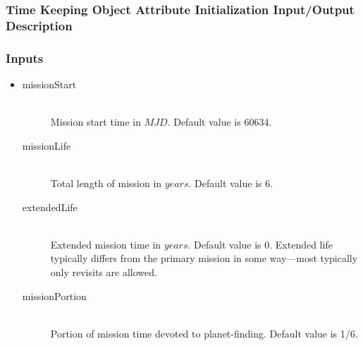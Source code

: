 \documentclass[cleanfoot]{asme2ej}
\begin{document}
\subsubsection{Time Keeping Object Attribute Initialization Input/Output Description}

\subsubsection*{Inputs}
\begin{itemize}
    \item
     \begin{description}
            \item[missionStart] \hfill \\
            Mission start time in $ MJD $. Default value is 60634.
            \item[missionLife] \hfill \\
            Total length of mission in $ years $. Default value is 6.
            \item[extendedLife] \hfill \\
            Extended mission time in $ years $. Default value is 0.  Extended life typically differs from the primary mission in some way---most typically only revisits are allowed.
            \item[missionPortion] \hfill \\
            Portion of mission time devoted to planet-finding. Default value is 1/6.
        \end{description}
\end{itemize}
\end{document}
